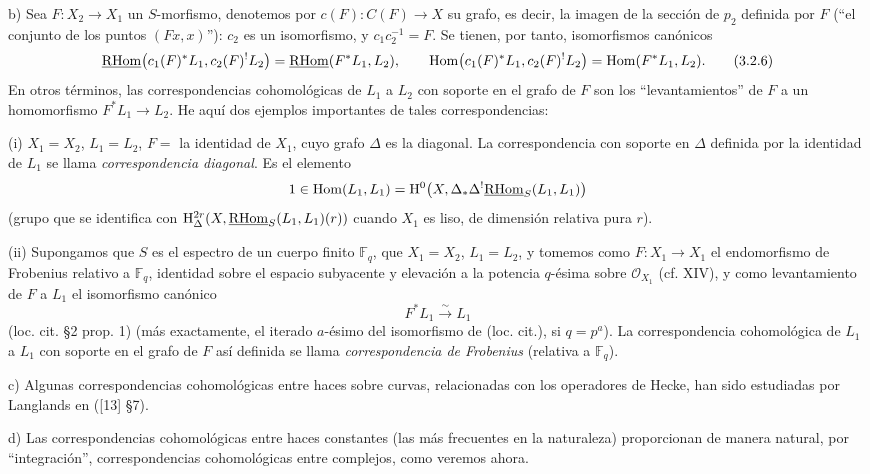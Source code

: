b) Sea $F:X_2\to X_1$ un $S$-morfismo, denotemos por $c(F):C(F)\to X$ su grafo, es decir, la imagen de la sección de $p_2$ definida por $F$ (``el conjunto de los puntos $(Fx,x)$''): $c_2$ es un isomorfismo, y $c_1c_2^{-1}=F$. Se tienen, por tanto, isomorfismos canónicos
\begin{equation}
\underline{\mathrm{RHom}}\bigl(c_1(F)^*L_1,c_2(F)^!L_2\bigr)=\underline{\mathrm{RHom}}(F^*L_1,L_2),
\qquad
\operatorname{Hom}\bigl(c_1(F)^*L_1,c_2(F)^!L_2\bigr)=\operatorname{Hom}(F^*L_1,L_2).
\tag{3.2.6}
\end{equation}
En otros términos, las correspondencias cohomológicas de $L_1$ a $L_2$ con soporte en el grafo de $F$ son los ``levantamientos'' de $F$ a un homomorfismo $F^*L_1\to L_2$. He aquí dos ejemplos importantes de tales correspondencias:

(i) $X_1=X_2$, $L_1=L_2$, $F=$ la identidad de $X_1$, cuyo grafo $\Delta$ es la diagonal. La correspondencia con soporte en $\Delta$ definida por la identidad de $L_1$ se llama \emph{correspondencia diagonal}. Es el elemento
\[
1\in \operatorname{Hom}(L_1,L_1)=\mathrm{H}^0\bigl(X,\Delta_*\Delta^!\underline{\mathrm{RHom}}_S(L_1,L_1)\bigr)
\]
(grupo que se identifica con $\mathrm{H}^{2r}_\Delta(X,\underline{\mathrm{RHom}}_S(L_1,L_1)(r))$ cuando $X_1$ es liso, de dimensión relativa pura $r$).

(ii) Supongamos que $S$ es el espectro de un cuerpo finito $\mathbb F_q$, que $X_1=X_2$, $L_1=L_2$, y tomemos como $F:X_1\to X_1$ el endomorfismo de Frobenius relativo a $\mathbb F_q$, identidad sobre el espacio subyacente y elevación a la potencia $q$-ésima sobre $\mathcal O_{X_1}$ (cf. XIV), y como levantamiento de $F$ a $L_1$ el isomorfismo canónico
\[
F^*L_1\xrightarrow{\sim}L_1
\]
(loc. cit. §2 prop. 1) (más exactamente, el iterado $a$-ésimo del isomorfismo de (loc. cit.), si $q=p^a$). La correspondencia cohomológica de $L_1$ a $L_1$ con soporte en el grafo de $F$ así definida se llama \emph{correspondencia de Frobenius} (relativa a $\mathbb F_q$).

c) Algunas correspondencias cohomológicas entre haces sobre curvas, relacionadas con los operadores de Hecke, han sido estudiadas por Langlands en ([13] §7).

d) Las correspondencias cohomológicas entre haces constantes (las más frecuentes en la naturaleza) proporcionan de manera natural, por ``integración'', correspondencias cohomológicas entre complejos, como veremos ahora.
